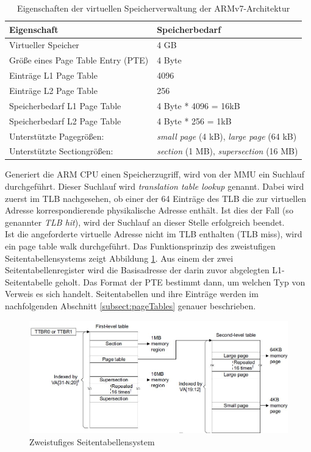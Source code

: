 \begin{table}[H]
\begin{tabular}{p{7cm} | p{7cm}}
  \textbf{Eigenschaft} & \textbf{Speicherbedarf} \\ \hline
  Virtueller Speicher & 4 GB\\  
  Größe eines Page Table Entry (PTE) & 4 Byte \\
  Einträge L1 Page Table & 4096\\
  Einträge L2 Page Table & 256\\
  Speicherbedarf L1 Page Table & 4 Byte * 4096 = 16kB \\
  Speicherbedarf L2 Page Table & 4 Byte * 256 = 1kB\\
  Unterstützte Pagegrößen: & \emph{small page} (4 kB), \emph{large page} (64 kB)\\
  Unterstützte Sectiongrößen: & \emph{section} (1 MB), \emph{supersection} (16 MB)\\
 \end{tabular}
 \caption{Eigenschaften der virtuellen Speicherverwaltung der ARMv7-Architektur}
 \label{table:GeneralVirtualMemory}
\end{table}

Generiert die ARM CPU einen Speicherzugriff, wird von der MMU ein Suchlauf durchgeführt. Dieser Suchlauf wird \emph{translation table lookup} genannt. Dabei wird zuerst im \ac{TLB} nachgesehen, ob einer der 64 Einträge des TLB die zur virtuellen Adresse korrespondierende physikalische Adresse enthält. Ist dies der Fall (so genannter \emph{TLB hit}), wird der Suchlauf an dieser Stelle erfolgreich beendet.\\

Ist die angeforderte virtuelle Adresse nicht im TLB enthalten (TLB miss), wird ein page table walk durchgeführt. Das Funktionsprinzip des zweistufigen Seitentabellensystems zeigt Abbildung \ref{fig:2levelTableSystem}. Aus einem der zwei Seitentabellenregister wird die Basisadresse der darin zuvor abgelegten L1-Seitentabelle geholt. Das Format der PTE bestimmt dann, um welchen Typ von Verweis es sich handelt. Seitentabellen und ihre Einträge werden im nachfolgenden Abschnitt \ref{subsect:pageTables} genauer beschrieben.\\

\begin{figure}[H]
	\includegraphics[scale=0.7]{chapters/mmu/figures/addressTranslation}
	\caption{Zweistufiges Seitentabellensystem \cite[S. B3-1325]{ARM:ARM}}
	\label{fig:2levelTableSystem}
\end{figure}

